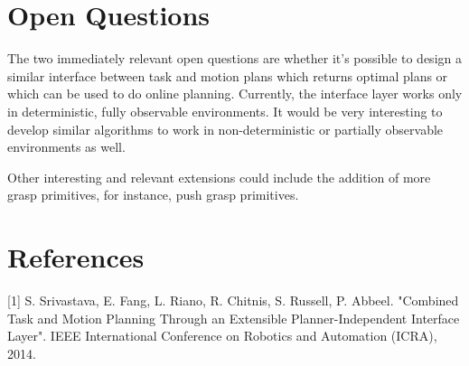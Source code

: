 \documentclass[12pt]{article}
\begin{document}
\section{Open Questions}

The two immediately relevant open questions are whether it's possible to design a similar interface between task and motion plans which returns optimal plans or which can be used to do online planning.
Currently, the interface layer works only in deterministic, fully observable environments.  
It would be very interesting to develop similar algorithms to work in non-deterministic or partially observable environments as well.

Other interesting and relevant extensions could include the addition of more grasp primitives, for instance, push grasp primitives.




\section{References}

[1] S. Srivastava, E. Fang, L. Riano, R. Chitnis, S. Russell, P. Abbeel. "Combined Task and Motion Planning Through an Extensible Planner-Independent Interface Layer". IEEE International Conference on Robotics and Automation (ICRA), 2014.
\end{document}
